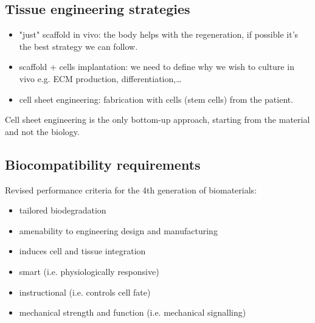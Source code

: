 \subsection{Tissue engineering strategies}
\begin{itemize}
\item "just" scaffold in vivo: the body helps with the regeneration, if possible it’s the best strategy we can follow.
\item scaffold + cells implantation: we need to define why we wish to culture in vivo e.g. ECM production, differentiation,…
\item cell sheet engineering: fabrication with cells (stem cells) from the patient.
\end{itemize}
\noindent
Cell sheet engineering is the only bottom-up approach, starting from the material and not the biology.

\subsection{Biocompatibility requirements}
Revised performance criteria for the 4th generation of biomaterials:
\begin{itemize}
\item tailored biodegradation
\item amenability to engineering design and manufacturing
\item induces cell and tissue integration
\item smart (i.e. physiologically responsive)
\item instructional (i.e. controls cell fate)
\item mechanical strength and function (i.e. mechanical signalling)
\end{itemize}

